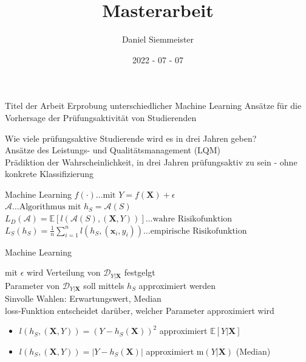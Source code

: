 \documentclass[17pt, fleqn]{beamer}
\title[]{Masterarbeit}
\author[]{Daniel Siemmeister}
\date[]{2022 - 07 - 07}
\begin{document}
\begin{frame}[plain]
    \titlepage    
\end{frame}

\begin{frame}{Titel der Arbeit}
\centering
\large{Erprobung unterschiedlicher Machine Learning Ansätze für die Vorhersage der Prüfungsaktivität von Studierenden}
\end{frame}

\begin{frame}
    Wie viele prüfungsaktive Studierende wird es in drei Jahren geben? \\[1cm]
    \pause
    Ansätze des Leistungs- und Qualitätsmanagement (LQM)\\[1cm]
    \pause
    Prädiktion der Wahrscheinlichkeit, in drei Jahren prüfungsaktiv zu sein - ohne konkrete Klassifizierung
\end{frame}


\begin{frame}{Machine Learning}
    \pause
    \small{
    $ f(\cdot) \dots \text{mit } Y = f(\mathbf{X}) + \epsilon $ \\[0.2cm]
    $ \mathcal{A} \dots \text{Algorithmus mit } h_S = \mathcal{A}(S) $ \\[0.2cm]
    $ L_D(\mathcal{A}) = \mathbb{E}[l(\mathcal{A}(S), (\mathbf{X}, Y)) ] \dots \text{wahre Risikofunktion} $ \\[0.2cm]
    $ L_S(h_S) = \frac{1}{n} \sum_{i=1}^n l(h_S, (\mathbf{x}_i, y_i)) \dots \text{empirische Risikofunktion} $ \\[0.2cm]
    }
\end{frame}

\begin{frame}{Machine Learning}
    
    \small{
        mit $ \epsilon $ wird Verteilung von $ \mathcal{D}_{Y|\mathbf{X}} $ festgelgt \\ [0.2cm]
        Parameter von $ \mathcal{D}_{Y|\mathbf{X}} $ soll mittels $ h_S $ approximiert werden \\ [0.2cm]
        Sinvolle Wahlen: Erwartungswert, Median \\ [0.2cm]
        loss-Funktion entscheidet darüber, welcher Parameter approximiert wird
        \begin{itemize}
            \item $l(h_S, (\mathbf{X}, Y)) = (Y - h_S(\mathbf{X}))^2 $ approximiert $\mathbb{E}[Y|\mathbf{X}] $
            \item $l(h_S, (\mathbf{X}, Y)) = |Y- h_S(\mathbf{X})| $ approximiert $\text{m}(Y|\mathbf{X}) $ (Median) 
        \end{itemize}
    }
\end{frame}
\end{document}
